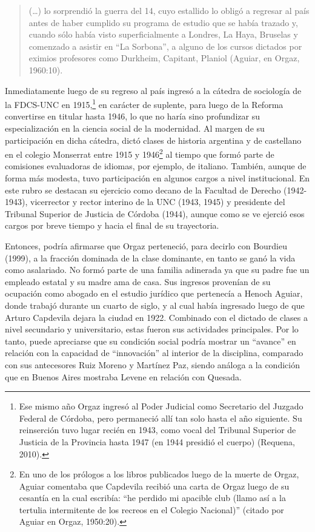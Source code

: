 \begin{quote}
(\dots) lo sorprendió la guerra del 14, cuyo estallido lo obligó a regresar al país antes de haber cumplido su programa de estudio que se había trazado y, cuando sólo había visto superficialmente a Londres, La Haya, Bruselas y comenzado a asistir en \enquote{La Sorbona}, a alguno de los cursos dictados por eximios profesores como Durkheim, Capitant, Planiol (Aguiar, en Orgaz, 1960:10).
\end{quote}

Inmediatamente luego de su regreso al país ingresó a la cátedra de sociología de la FDCS-UNC en 1915,\footnote{Ese mismo año Orgaz ingresó al Poder Judicial como Secretario del Juzgado Federal de Córdoba, pero permaneció allí tan solo hasta el año siguiente. Su reinserción tuvo lugar recién en 1943, como vocal del Tribunal Superior de Justicia de la Provincia hasta 1947 (en 1944 presidió el cuerpo) (Requena, 2010).} en carácter de suplente, para luego de la Reforma convertirse en titular hasta 1946, lo que no haría sino profundizar su especialización en la ciencia social de la modernidad. Al margen de su participación en dicha cátedra, dictó clases de historia argentina y de castellano en el colegio Monserrat entre 1915 y 1946\footnote{En uno de los prólogos a los libros publicados luego de la muerte de Orgaz, Aguiar comentaba que Capdevila recibió una carta de Orgaz luego de su cesantía en la cual escribía: \enquote{he perdido mi apacible club (llamo así a la tertulia intermitente de los recreos en el Colegio Nacional)} (citado por Aguiar en Orgaz, 1950:20).} al tiempo que formó parte de comisiones evaluadoras de idiomas, por ejemplo, de italiano. También, aunque de forma más modesta, tuvo participación en algunos cargos a nivel institucional. En este rubro se destacan su ejercicio como decano de la Facultad de Derecho (1942-1943), vicerrector y rector interino de la UNC (1943, 1945) y presidente del Tribunal Superior de Justicia de Córdoba (1944), aunque como se ve ejerció esos cargos por breve tiempo y hacia el final de su trayectoria.

Entonces, podría afirmarse que Orgaz perteneció, para decirlo con Bourdieu (1999), a la fracción dominada de la clase dominante, en tanto se ganó la vida como asalariado. No formó parte de una familia adinerada ya que su padre fue un empleado estatal y su madre ama de casa. Sus ingresos provenían de su ocupación como abogado en el estudio jurídico que pertenecía a Henoch Aguiar, donde trabajó durante un cuarto de siglo, y al cual había ingresado luego de que Arturo Capdevila dejara la ciudad en 1922. Combinado con el dictado de clases a nivel secundario y universitario, estas fueron sus actividades principales. Por lo tanto, puede apreciarse que su condición social podría mostrar un \enquote{avance} en relación con la capacidad de \enquote{innovación} al interior de la disciplina, comparado con sus antecesores Ruiz Moreno y Martínez Paz, siendo análoga a la condición que en Buenos Aires mostraba Levene en relación con Quesada.

